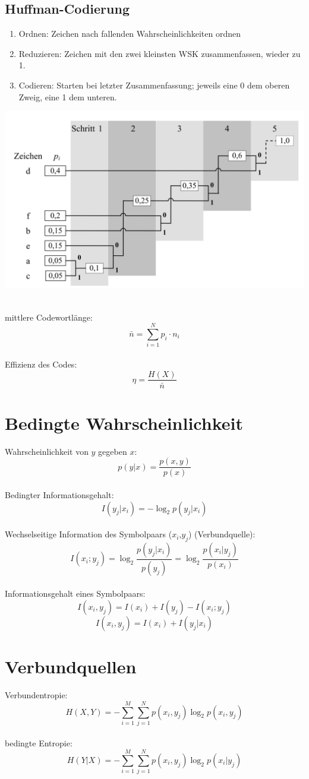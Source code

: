 \subsection{Huffman-Codierung}
\begin{enumerate}
	\item Ordnen: Zeichen nach fallenden Wahrscheinlichkeiten ordnen
	\item Reduzieren: Zeichen mit den zwei kleinsten WSK zusammenfassen,
		wieder zu 1.
	\item Codieren: Starten bei letzter Zusammenfassung; jeweils eine
		0 dem oberen Zweig, eine 1 dem unteren.
\end{enumerate}
\begin{center}
	\includegraphics[width=.9\textwidth]{./images/huffman.png}
\end{center}
~\\
mittlere Codewortlänge:
\[ \bar{n} = \sum_{i=1}^{N}p_i \cdot n_i \]
~\\
Effizienz des Codes:
\[ \eta = \frac{H(X)}{\bar{n}} \]

\section{Bedingte Wahrscheinlichkeit}
Wahrscheinlichkeit von $y$ gegeben $x$:
\[ p(y|x) = \frac{p(x,y)}{p(x)} \]
~\\
Bedingter Informationsgehalt:
\[ I(y_j|x_i) = -\log_2p(y_j|x_i) \]
~\\
Wechselseitige Information des Symbolpaars ($x_i$,$y_j$) (Verbundquelle):
\[ I(x_i;y_j) = \log_2\frac{p(y_j|x_i)}{p(y_j)} = \log_2\frac{p(x_i|y_j)}{p(x_i)} \]
~\\
Informationsgehalt eines Symbolpaars:
\[ I(x_i,y_j) = I(x_i) + I(y_j) - I(x_i;y_j) \]
\[ I(x_i,y_j) = I(x_i) + I(y_j|x_i)  \]

\section{Verbundquellen}
Verbundentropie:
\[ H(X,Y) = - \sum_{i=1}^{M}\sum_{j=1}^{N} p(x_i,y_j)\log_2p(x_i,y_j) \]
~\\
bedingte Entropie:
\[ H(Y|X) = - \sum_{i=1}^{M}\sum_{j=1}^{N} p(x_i,y_j)\log_2p(x_i|y_j) \]

